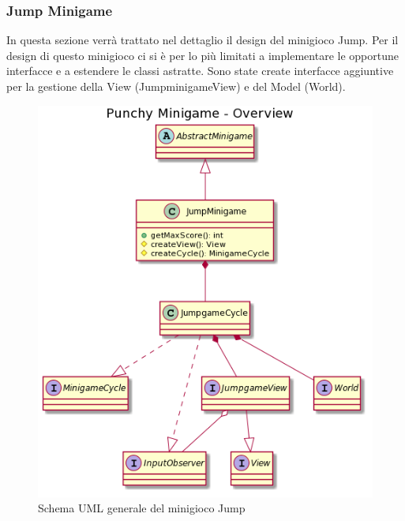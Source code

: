 \documentclass[a4paper,12pt]{report}
\begin{document}
	\subsubsection{Jump Minigame}
	In questa sezione verrà trattato nel dettaglio il design del minigioco Jump.\newline
	\newline
	Per il design di questo minigioco ci si è per lo più limitati a implementare le opportune interfacce e a estendere le classi astratte. Sono state create interfacce aggiuntive per la gestione della View (JumpminigameView) e del Model (World).
    \begin{figure}[!t]
        \centering{}
        \includegraphics[width=150mm]{images/picchiotti/jumpoverview.png}
        \caption{Schema UML generale del minigioco Jump}
        \label{img:jumpoverview}
    \end{figure}
\end{document}
